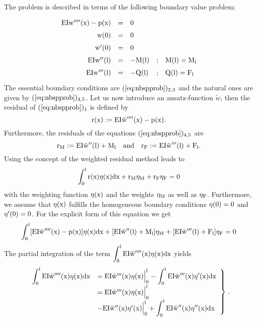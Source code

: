 The problem is described in terms of the following boundary 
value problem:
\begin{equation} 
\renewcommand{\arraystretch}{1.5}
\begin{array}{rclcl}
\rm EI w''''(x) - p(x) & = &\rm  0       &   & \\ 
\rm              w(0)  & = &\rm  0       &   & \\ 
\rm             w'(0)  & = &\rm  0       &   & \\ 
\rm         EI w''(l)  & = &\rm  -M(l) & ; &\rm   M(l) = M_l \\ 
\rm       EI w'''(l)   & = &\rm  -Q(l) & ; &\rm   Q(l) = F_l \\
\end{array}
\label{eq:nbspprob}
\end{equation}
The essential boundary conditions are $(\ref{eq:nbspprob})_{2,3}$ and the
natural ones are given by $(\ref{eq:nbspprob})_{4,5}$.
Let us now introduce an ansatz-function 
$\tilde{w}$, then the residual of $(\ref{eq:nbspprob})_{1}$ is defined by
\begin{equation}
\rm
r(x) := EI \tilde{w}''''(x) - p(x) .
\end{equation}
Furthermore, the residuals of the equations $(\ref{eq:nbspprob})_{4,5}$ are
\begin{equation}
\rm 
r_M := EI \tilde{w}''(l) + M_l 
\quad \mbox{and} \quad 
r_F := EI \tilde{w}'''(l) + F_l.
\end{equation}
Using the concept of the weighted residual method leads to 
\begin{equation}
\rm
\int_0^l r(x) \eta(x) dx + r_M \eta_M + r_F \eta_F = 0 
\end{equation}
with the weighting function $\rm \eta(x)$ 
and the weights
$\rm \eta_M$ as well as $\rm \eta_F$.
Furthermore, we assume that $\rm \eta(x)$  fulfills the homogeneous boundary 
conditions $\rm\eta(0)=0$ and  $\rm \eta'(0)=0$. 
For the explicit form of this equation we get 
\begin{equation}
\rm  
\int_0^l [EI \tilde{w}''''(x) - p(x)] \eta(x) dx 
+ [EI \tilde{w}''(l) + 
M_l] \eta_M + [EI \tilde{w}'''(l) + F_l] \eta_F = 0
\label{eq:nzwErg1}
\end{equation}
The partial integration of the term  
$\rm\displaystyle\int_0^l EI \tilde{w}''''(x)  \eta(x) dx $ yields
\begin{equation} 
\left. 
\renewcommand{\arraystretch}{1.5}
\begin{array}{ll}
\rm \displaystyle \int_0^l EI \tilde{w}''''(x) \eta(x) dx & = 
\rm \Bigl. EI \tilde{w}'''(x) \eta(x) \Bigr|_0^l - 
\displaystyle \int_0^l EI \tilde{w}'''(x) \eta'(x) dx 
\\ 
              & = 
\rm \Bigl. EI \tilde{w}'''(x) \eta(x) \Bigr|_0^l 
\\ 
              & - 
\rm \Bigl. EI \tilde{w}''(x) \eta'(x) \Bigr|_0^l + 
\displaystyle \int_0^l EI \tilde{w}''(x) \eta''(x) dx
\end{array}
\right\} \, .
\label{eq:nzwErg2}
\end{equation}
